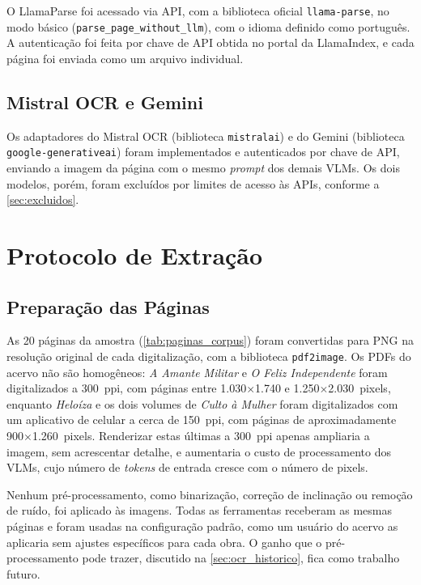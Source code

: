 \documentclass[noabntexcite,oneside]{ufsc-thesis-rn46-2019}
\begin{document}
O LlamaParse foi acessado via API, com a biblioteca oficial \texttt{llama-parse}, no modo
básico (\texttt{parse\_page\_without\_llm}), com o idioma definido como português. A autenticação foi feita por chave de API obtida no portal da
LlamaIndex, e cada página foi enviada como um arquivo individual.

\subsection{Mistral OCR e Gemini}

Os adaptadores do Mistral OCR (biblioteca \texttt{mistralai}) e do Gemini (biblioteca
\texttt{google-generativeai}) foram implementados e autenticados por chave de API, enviando
a imagem da página com o mesmo \textit{prompt} dos demais VLMs. Os dois modelos, porém,
foram excluídos por limites de acesso às APIs, conforme a \autoref{sec:excluidos}.

\section{Protocolo de Extração}
\label{sec:protocolo_extracao}

\subsection{Preparação das Páginas}

As 20 páginas da amostra (\autoref{tab:paginas_corpus}) foram convertidas para PNG na
resolução original de cada digitalização, com a biblioteca \texttt{pdf2image}. Os PDFs do
acervo não são homogêneos: \textit{A Amante Militar} e \textit{O Feliz Independente} foram
digitalizados a 300~ppi, com páginas entre 1.030$\times$1.740 e 1.250$\times$2.030~pixels, enquanto
\textit{Heloíza} e os dois volumes de \textit{Culto à Mulher} foram digitalizados com um
aplicativo de celular a cerca de 150~ppi, com páginas de aproximadamente
900$\times$1.260~pixels. Renderizar estas últimas a 300~ppi apenas ampliaria a imagem, sem
acrescentar detalhe, e aumentaria o custo de processamento dos VLMs, cujo número de
\textit{tokens} de entrada cresce com o número de pixels.

Nenhum pré-processamento, como binarização, correção de inclinação ou remoção de ruído, foi
aplicado às imagens. Todas as ferramentas receberam as mesmas páginas e foram usadas na
configuração padrão, como um usuário do acervo as aplicaria sem ajustes específicos para
cada obra. O ganho que o pré-processamento pode trazer, discutido na
\autoref{sec:ocr_historico}, fica como trabalho futuro.
\end{document}
